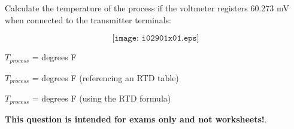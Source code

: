 

Calculate the temperature of the process if the voltmeter registers 60.273 mV when connected to the transmitter terminals:

$$\texttt{[image: i02901x01.eps]}$$

$T_{process}$ = \underbar{\hskip 50pt} degrees F







$T_{process}$ =  degrees F (referencing an RTD table)
 
\vskip 10pt

$T_{process}$ =  degrees F (using the RTD formula)
 






{\bf This question is intended for exams only and not worksheets!}.



